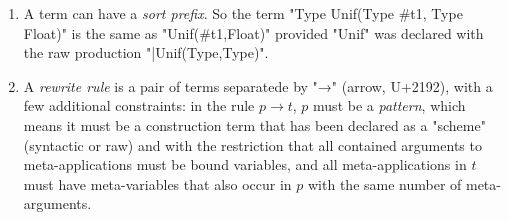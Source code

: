\documentclass[11pt]{article} %
\begin{document}
\begin{manual}
\begin{enumerate}

  \item A term can have a \emph{sort prefix}. So the term "Type Unif(Type #t1, Type Float)" is the
    same as "Unif(#t1,Float)" provided "Unif" was declared with the raw production
    "|Unif(Type,Type)".

  \item A \emph{rewrite rule} is a pair of terms separatede by "→" (arrow, U+2192), with a few
    additional constraints: in the rule $p→t$, $p$ must be a \emph{pattern}, which means it must be
    a construction term that has been declared as a "scheme" (syntactic or raw) and with the
    restriction that all contained arguments to meta-applications must be bound variables, and all
    meta-applications in $t$ must have meta-variables that also occur in $p$ with the same number of
    meta-arguments.


\end{enumerate}
\end{manual}
\end{document}
